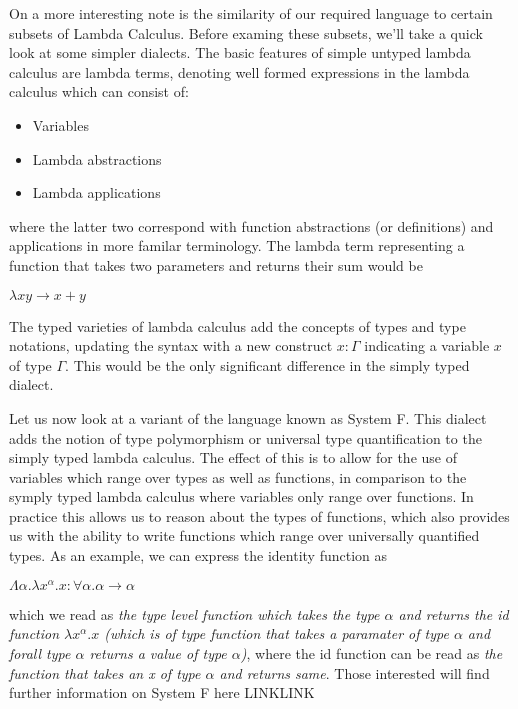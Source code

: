 On a more interesting note is the similarity of our required language to
certain subsets of Lambda Calculus. Before examing these subsets, we'll
take a quick look at some simpler dialects. The basic
features of simple untyped lambda calculus are lambda terms, denoting well 
formed expressions in the lambda calculus which can consist of:

\begin{itemize}
\item Variables
\item Lambda abstractions
\item Lambda applications
\end{itemize}

\noindent where the latter two correspond with function abstractions (or
definitions) and applications in more familar terminology. The lambda term
representing a function that takes two parameters and returns their sum 
would be 

\begin{center} 
	\( \lambda x y \rightarrow x + y \)
\end{center}

\noindent The typed varieties of lambda calculus add the concepts of types and type
notations, updating the syntax with a new construct \(x:\Gamma \) indicating
a variable \(x\) of type \(\Gamma\). This would be the only significant 
difference in the simply typed dialect. 

Let us now look at a variant of the language known as System F. This dialect
adds the notion of type polymorphism or universal type quantification to 
the simply typed lambda calculus. The effect of this is to allow for the
use of variables which range over types as well as functions, in comparison
to the symply typed lambda calculus where variables only range over functions.
In practice this allows us to reason about the types of functions, which also
provides us with the ability to write functions which range over universally
quantified types. As an example, we can express the identity function as

\begin{center}
 \( \Lambda \alpha . \lambda x^\alpha . x : \forall \alpha . \alpha \rightarrow \alpha  \)
\end{center}

\noindent which we read as \emph{the type level function which takes 
the type \(\alpha\) and returns the id function \( \lambda x^\alpha . x \)
(which is of type \emph{ function that takes a paramater of type \( \alpha \) 
and forall type \(\alpha\) returns a value of type \( \alpha \)})}, where 
the id function can be read as \emph{the function that takes an x of 
type \( \alpha \) and returns same}. Those interested will find further information
on System F here LINKLINK

